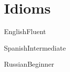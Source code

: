 \documentclass{tccv}
\begin{document}
\begin{yearlist}



%
\end{yearlist}

\section{Idioms}

\begin{factlist}
\item{English}{Fluent}
\item{Spanish}{Intermediate}
\item{Russian}{Beginner}
\end{factlist}

\end{document}
